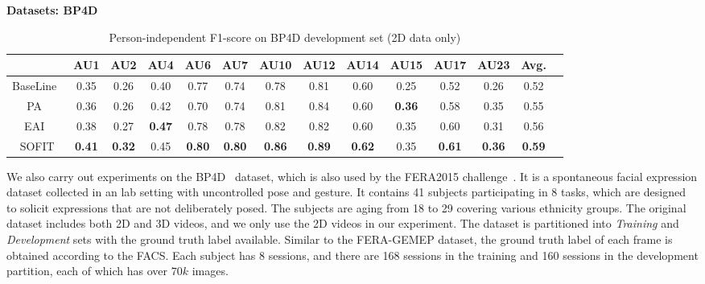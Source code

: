 \documentclass[review]{elsarticle}
\begin{document}
\noindent \textbf{Datasets: BP4D}


\begin{table}
	\caption{Person-independent F1-score on BP4D development set (2D data only)}
	\begin{center}
		\label{table:bp}
		\begin{tabular}{cccccccccccccc}
			\toprule
			& AU1 & AU2 & AU4 & AU6 & AU7 & AU10 & AU12 & AU14 & AU15 & AU17 & AU23 & Avg.	\\ 
			\midrule
			BaseLine~\cite{FERA15}	&0.35	&0.26	&0.40	&0.77	&0.74	&0.78	&0.81	&0.60	&0.25	&0.52	&0.26	&0.52 \\
			PA~\cite{Tadas_ECCV14}					&0.36	&0.26	&0.42	&0.70	&0.74	&0.81	&0.84	&0.60	&\textbf{0.36}\cellcolor[gray]{0.9}	&0.58	&0.35	&0.55 \\
			EAI~\cite{Yang_SMCB12}					&0.38	&0.27	&\textbf{0.47}\cellcolor[gray]{0.9}	&0.78	&0.78	&0.82	&0.82	&0.60	&0.35	&0.60	&0.31	&0.56 \\
			SOFIT														&\textbf{0.41}\cellcolor[gray]{0.9}	&\textbf{0.32}\cellcolor[gray]{0.9}	&0.45	&\textbf{0.80}\cellcolor[gray]{0.9}	&\textbf{0.80}\cellcolor[gray]{0.9}	&\textbf{0.86}\cellcolor[gray]{0.9}	&\textbf{0.89}\cellcolor[gray]{0.9}	&\textbf{0.62}\cellcolor[gray]{0.9}	&0.35	&\textbf{0.61}\cellcolor[gray]{0.9}	&\textbf{0.36}\cellcolor[gray]{0.9}	&\textbf{0.59}\cellcolor[gray]{0.9} \\
			\bottomrule
		\end{tabular}
	\end{center}
\end{table}


We also carry out experiments on the BP4D~\cite{BP4D} dataset, which is also used by the FERA2015 challenge~\cite{FERA15}. It is a spontaneous facial expression dataset collected in an lab setting with uncontrolled pose and gesture. It contains 41 subjects participating in 8 tasks, which are designed to solicit expressions that are not deliberately posed. The subjects are aging from 18 to 29 covering various ethnicity groups. The original dataset includes both 2D and 3D videos, and we only use the 2D videos in our experiment. The dataset is partitioned into \textit{Training} and \textit{Development} sets with the ground truth label available. Similar to the FERA-GEMEP dataset, the ground truth label of each frame is obtained according to the FACS. Each subject has 8 sessions, and there are 168 sessions in the training and 160 sessions in the development partition, each of which has over $70k$ images.
\end{document}
